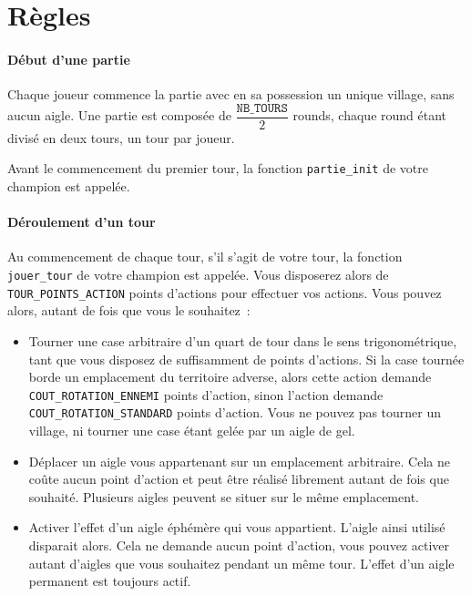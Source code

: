 \newpage
\section{Règles}
\paragraph{Début d'une partie}
Chaque joueur commence la partie avec en sa possession un unique village,
sans aucun aigle.
Une partie est composée de $\dfrac{\mathtt{NB\_TOURS}}2$ rounds, chaque round
étant divisé en deux tours, un tour par joueur.

Avant le commencement du premier tour, la fonction \texttt{partie\_init}
de votre champion est appelée.

\paragraph{Déroulement d'un tour}
Au commencement de chaque tour, s'il s'agit de votre tour, la fonction
\texttt{jouer\_tour} de votre champion est appelée.
Vous disposerez alors de \texttt{TOUR\_POINTS\_ACTION} points d'actions
pour effectuer vos actions.
Vous pouvez alors, autant de fois que vous le souhaitez~:
\begin{itemize}
    \item
        Tourner une case arbitraire d'un quart de tour dans le sens
        trigonométrique, tant que vous disposez de suffisamment de points
        d'actions.
        Si la case tournée borde un emplacement du territoire adverse, alors
        cette action demande \texttt{COUT\_ROTATION\_ENNEMI} points d'action,
        sinon l'action demande \texttt{COUT\_ROTATION\_STANDARD} points
        d'action.
        Vous ne pouvez pas tourner un village, ni tourner une case étant
        gelée par un aigle de gel.
    \item
        Déplacer un aigle vous appartenant sur un emplacement arbitraire.
        Cela ne coûte aucun point d'action et peut être réalisé librement
        autant de fois que souhaité.
        Plusieurs aigles peuvent se situer sur le même emplacement.
    \item
        Activer l'effet d'un aigle éphémère qui vous appartient.
        L'aigle ainsi utilisé disparait alors.
        Cela ne demande aucun point d'action, vous pouvez activer autant
        d'aigles que vous souhaitez pendant un même tour.
        L'effet d'un aigle permanent est toujours actif.
\end{itemize}

